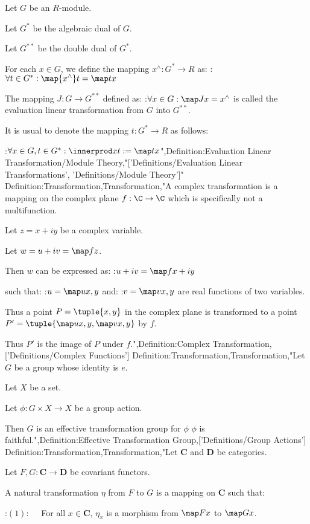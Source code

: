 Let $G$ be an $R$-module.

Let $G^*$ be the algebraic dual of $G$.

Let $G^{**}$ be the double dual of $G^*$.


For each $x \in G$, we define the mapping $x^\wedge: G^* \to R$ as:
:$\forall t \in G^*: \map {x^\wedge} t = \map t x$


The mapping $J: G \to G^{**}$ defined as:
:$\forall x \in G: \map J x = x^\wedge$
is called the evaluation linear transformation from $G$ into $G^{**}$.


It is usual to denote the mapping $t: G^* \to R$ as follows:

:$\forall x \in G, t \in G^*: \innerprod x t := \map t x$",Definition:Evaluation Linear Transformation/Module Theory,"['Definitions/Evaluation Linear Transformations', 'Definitions/Module Theory']"
Definition:Transformation,Transformation,"A complex transformation is a mapping on the complex plane $f: \C \to \C$ which is specifically not a multifunction.


Let $z = x + i y$ be a complex variable.

Let $w = u + i v = \map f z$.


Then $w$ can be expressed as:
:$u + i v = \map f {x + i y}$

such that:
:$u = \map u {x, y}$
and:
:$v = \map v {x, y}$
are real functions of two variables.


Thus a point $P = \tuple {x, y}$ in the complex plane is transformed to a point $P' = \tuple {\map u {x, y}, \map v {x, y} }$ by $f$.

Thus $P'$ is the image of $P$ under $f$.",Definition:Complex Transformation,['Definitions/Complex Functions']
Definition:Transformation,Transformation,"Let $G$ be a group whose identity is $e$.

Let $X$ be a set.

Let $\phi: G \times X \to X$ be a group action.


Then $G$ is an effective transformation group for $\phi$  $\phi$ is faithful.",Definition:Effective Transformation Group,['Definitions/Group Actions']
Definition:Transformation,Transformation,"Let $\mathbf C$ and $\mathbf D$ be categories.

Let $F, G : \mathbf C \to \mathbf D$ be covariant functors.


A natural transformation $\eta$ from $F$ to $G$ is a mapping on $\mathbf C$ such that:


:$(1): \quad$ For all $x \in \mathbf C$, $\eta_x$ is a morphism from $\map F x$ to $\map G x$.

